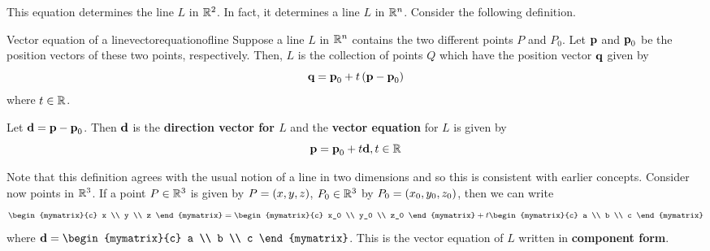 This equation determines the line $L$ in $\mathbb{R}^2$. In fact, it determines a line $L$ in $\mathbb{R}^n$. Consider the following definition.

\begin{definition}{Vector equation of a line}{vectorequationofline}
Suppose a line $L$ in $\mathbb{R}^{n}$ contains the two different points $P$ and 
$P_0$. Let $\mbox{\bf p}$ and $\mbox{\bf p}_0$ be the position vectors of these two points, respectively.
Then, $L$ is the collection of points $Q$ which have the position vector $\mbox{\bf q}$ given by
\begin{equation*}
\mbox{\bf q}=\mbox{\bf p}_0+t\left(\mbox{\bf p}-\mbox{\bf p}_0\right)
\end{equation*}
where $t\in \mathbb{R}$. 

Let $\mbox{\bf d} = \mbox{\bf p} - \mbox{\bf p}_0$. Then $\mbox{\bf d}$ is the \textbf{direction vector for $L$} and the \textbf{vector equation} for $L$ is given by 
\begin{equation*}
\mbox{\bf p}=\mbox{\bf p}_0+t\mbox{\bf d}, t\in\mathbb{R}
\end{equation*}
\end{definition}

Note that this definition agrees with the usual notion of a
line in two dimensions and so this is consistent with earlier concepts. Consider now points in $\mathbb{R}^3$. If a point $P \in \mathbb{R}^3$ is given by $P = \left(x,y,z \right)$, $P_0 \in \mathbb{R}^3$ by $P_0 = \left(x_0, y_0, z_0 \right)$, then we can write
\begin{equation*}
\begin{mymatrix}{c}
x \\
y \\
z 
\end{mymatrix} = 
\begin{mymatrix}{c}
x_0 \\
y_0 \\
z_0 
\end{mymatrix}
+
t
\begin{mymatrix}{c}
a \\
b \\
c 
\end{mymatrix}
\end{equation*}
where $\vect{d} = \begin{mymatrix}{c}
a \\
b \\
c 
\end{mymatrix}$. This is the vector equation of $L$ written in \textbf{component form}.

